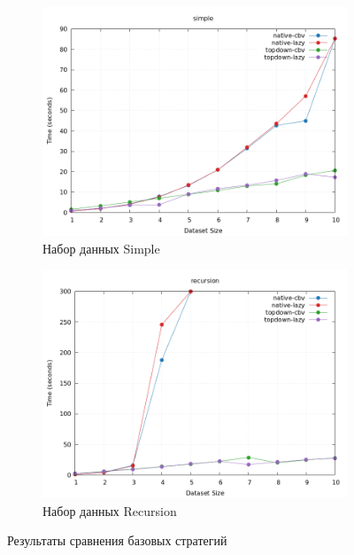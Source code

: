 \documentclass[../diploma.tex]{subfiles}
\begin{document}
\begin{figure}[h]
    \begin{subfigure}{0.5\textwidth}
    \includegraphics[width=\linewidth]{basic_simple.png} 
    \caption{Набор данных Simple}
    \end{subfigure}
    \begin{subfigure}{0.5\textwidth}
    \includegraphics[width=\linewidth]{basic_recursion.png}
    \caption{Набор данных Recursion}
    \end{subfigure}
    \caption{Результаты сравнения базовых стратегий}
    \label{plot_basic}
\end{figure}
\end{document}
